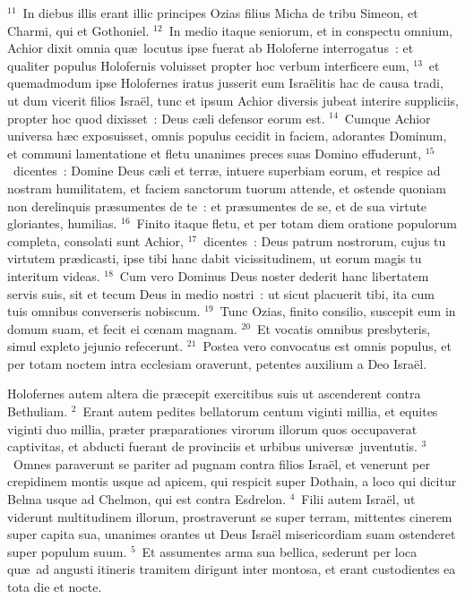 ${}^{11}$~In diebus illis erant illic principes Ozias filius Micha de tribu Simeon, et Charmi, qui et Gothoniel.
${}^{12}$~In medio itaque seniorum, et in conspectu omnium, Achior dixit omnia qu\ae\ locutus ipse fuerat ab Holoferne interrogatus~: et qualiter populus Holofernis voluisset propter hoc verbum interficere eum,
${}^{13}$~et quemadmodum ipse Holofernes iratus jusserit eum Isra\"elitis hac de causa tradi, ut dum vicerit filios Isra\"el, tunc et ipsum Achior diversis jubeat interire suppliciis, propter hoc quod dixisset~: Deus c\ae li defensor eorum est.
${}^{14}$~Cumque Achior universa h\ae c exposuisset, omnis populus cecidit in faciem, adorantes Dominum, et communi lamentatione et fletu unanimes preces suas Domino effuderunt,
${}^{15}$~dicentes~: Domine Deus c\ae li et terr\ae , intuere superbiam eorum, et respice ad nostram humilitatem, et faciem sanctorum tuorum attende, et ostende quoniam non derelinquis pr\ae sumentes de te~: et pr\ae sumentes de se, et de sua virtute gloriantes, humilias.
${}^{16}$~Finito itaque fletu, et per totam diem oratione populorum completa, consolati sunt Achior,
${}^{17}$~dicentes~: Deus patrum nostrorum, cujus tu virtutem pr\ae dicasti, ipse tibi hanc dabit vicissitudinem, ut eorum magis tu interitum videas.
${}^{18}$~Cum vero Dominus Deus noster dederit hanc libertatem servis suis, sit et tecum Deus in medio nostri~: ut sicut placuerit tibi, ita cum tuis omnibus converseris nobiscum.
${}^{19}$~Tunc Ozias, finito consilio, suscepit eum in domum suam, et fecit ei cœnam magnam.
${}^{20}$~Et vocatis omnibus presbyteris, simul expleto jejunio refecerunt.
${}^{21}$~Postea vero convocatus est omnis populus, et per totam noctem intra ecclesiam oraverunt, petentes auxilium a Deo Isra\"el.

\bchapter
\lettrine[lines=3,image=true,loversize=0.05,lraise=-0.03]{H}{}olofernes autem altera die pr\ae cepit exercitibus suis ut ascenderent contra Bethuliam.
${}^{2}$~Erant autem pedites bellatorum centum viginti millia, et equites viginti duo millia, pr\ae ter pr\ae parationes virorum illorum quos occupaverat captivitas, et abducti fuerant de provinciis et urbibus univers\ae\ juventutis.
${}^{3}$~Omnes paraverunt se pariter ad pugnam contra filios Isra\"el, et venerunt per crepidinem montis usque ad apicem, qui respicit super Dothain, a loco qui dicitur Belma usque ad Chelmon, qui est contra Esdrelon.
${}^{4}$~Filii autem Isra\"el, ut viderunt multitudinem illorum, prostraverunt se super terram, mittentes cinerem super capita sua, unanimes orantes ut Deus Isra\"el misericordiam suam ostenderet super populum suum.
${}^{5}$~Et assumentes arma sua bellica, sederunt per loca qu\ae\ ad angusti itineris tramitem dirigunt inter montosa, et erant custodientes ea tota die et nocte.


